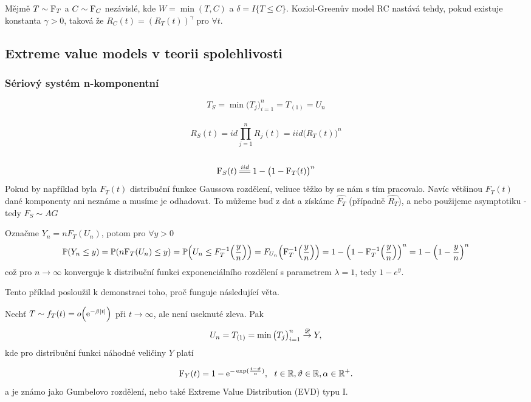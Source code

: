 \begin{define}
	Mějmě $T\sim \mathrm{F}_T$ a $C\sim \mathrm{F}_C$ nezávislé, kde $W = \min(T,C)$ a $\delta = I\lbrace T \leq C \rbrace$. Koziol-Greenův model RC nastává tehdy, pokud existuje konstanta $\gamma >0$, taková že $R_C(t) = (R_T(t))^{\gamma}$ pro $\forall t$. 
\end{define}

\subsection{Extreme value models v teorii spolehlivosti}

\subsubsection{Sériový systém n-komponentní}
$$T_S = \min{\big(T_j\big)_{i=1}^n} = T_{(1)} = U_n$$\\
$$R_S(t)\equal{id} \prod_{j=1}^n R_j(t) \equal{iid} \big(R_T(t) \big)^n$$ \\
$$\FF_S(t) \equal{iid} 1 - \big(1-\FF_T(t)\big)^n$$
Pokud by například byla $F_T(t)$ distribuční funkce Gaussova rozdělení, veliuce těžko by se nám s tím pracovalo. Navíc většinou $F_T(t)$ dané komponenty ani neznáme a musíme je odhadovat. To můžeme buď z dat a získáme $\hat{F_T}$ (případně $\hat{R_T}$), a nebo použijeme asymptotiku - tedy $F_S \sim AG $
\begin{example}
	Označme $Y_n =nF_T(U_n)$, potom pro $\forall y>0$
	$$\mathbb{P}(Y_n \leq y) = \mathbb{P}(n\mathrm{F}_T(U_n)\leq y) =  \mathbb{P}\Big(U_n\leq F^{-1}_T\Big(\frac{y}{n}\Big)\Big) = F_{U_n}\Big(\mathrm{F}^{-1}_T\Big(\frac{y}{n}\Big)\Big) = 1 - \Big(1-\mathrm{F}^{-1}_T\Big(\frac{y}{n}\Big)\Big)^n  = 1 - \Big(1-\frac{y}{n}\Big)^n$$ 
	což pro $n\rightarrow \infty$ konverguje k distribuční funkci exponenciálního rozdělení s parametrem $\lambda = 1$, tedy $1 - e^y$. 
\end{example}
Tento příklad posloužil k demonstraci toho, proč funguje následující věta.
\begin{theorem}
	Nechť $T \sim f_T(t) = o\Big(\mathrm{e}^{-\beta\left|t\right|} \Big)$ při $t \rightarrow \infty$, ale není useknuté zleva. Pak 
	$$U_n = T_{(1)} = \min{\big(T_j\big)_{i=1}^n}  \stackrel{\mathscr{D}}{\to} Y  ,$$ kde
	pro distribuční funkci náhodné veličiny $Y$ platí
	
	$$ \mathrm{F}_Y(t)  = 1 - \mathrm{e}^{-\exp(\frac{t-\vartheta}{\alpha} )},~~t \in \mathbb{R}, \vartheta \in \mathbb{R}, \alpha \in\mathbb{R}^+.  $$
	a je známo jako Gumbelovo rozdělení, nebo také Extreme Value Distribution (EVD) typu I.
\end{theorem}

